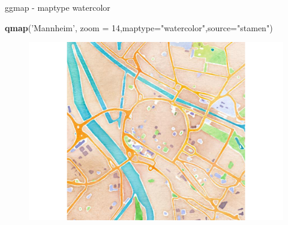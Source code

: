 \documentclass[ignorenonframetext,]{beamer}
\newenvironment{Shaded}{}{}
\newcommand{\KeywordTok}[1]{\textcolor[rgb]{0.00,0.44,0.13}{\textbf{{#1}}}}
\newcommand{\DataTypeTok}[1]{\textcolor[rgb]{0.56,0.13,0.00}{{#1}}}
\newcommand{\DecValTok}[1]{\textcolor[rgb]{0.25,0.63,0.44}{{#1}}}
\newcommand{\StringTok}[1]{\textcolor[rgb]{0.25,0.44,0.63}{{#1}}}
\newcommand{\NormalTok}[1]{{#1}}
\begin{document}
\begin{frame}[fragile]{ggmap - maptype watercolor}

\begin{Shaded}
\begin{Highlighting}[]
\KeywordTok{qmap}\NormalTok{(}\StringTok{'Mannheim'}\NormalTok{, }\DataTypeTok{zoom =} \DecValTok{14}\NormalTok{,}\DataTypeTok{maptype=}\StringTok{"watercolor"}\NormalTok{,}\DataTypeTok{source=}\StringTok{"stamen"}\NormalTok{)}
\end{Highlighting}
\end{Shaded}

\begin{figure}[htbp]
\centering
\includegraphics{RSocialScience2_files/figure-beamer/unnamed-chunk-41-1.pdf}
\caption{}
\end{figure}

\end{frame}
\end{document}
